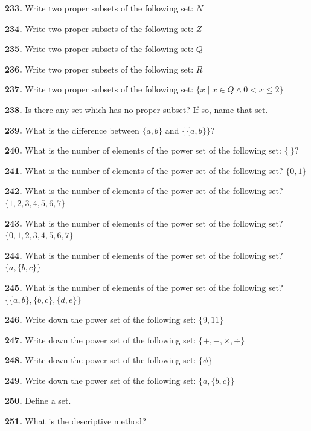 \documentclass[11pt]{article}
\begin{document}
\bigskip
\noindent\textbf{233.} Write two proper subsets of the following set: $N$

\bigskip
\noindent\textbf{234.} Write two proper subsets of the following set: $Z$

\bigskip
\noindent\textbf{235.} Write two proper subsets of the following set: $Q$

\bigskip
\noindent\textbf{236.} Write two proper subsets of the following set: $R$

\bigskip
\noindent\textbf{237.} Write two proper subsets of the following set: $\{x \mid x\in Q \land 0<x\leq2\}$

\bigskip
\noindent\textbf{238.} Is there any set which has no proper subset? If so, name that set.

\bigskip
\noindent\textbf{239.} What is the difference between $\{a,b\}$ and $\{\{a,b\}\}$?

\bigskip
\noindent\textbf{240.} What is the number of elements of the power set of the following set: $\{\ \}$?

\bigskip
\noindent\textbf{241.} What is the number of elements of the power set of the following set? $\{0,1\}$

\bigskip
\noindent\textbf{242.} What is the number of elements of the power set of the following set? $\{1,2,3,4,5,6,7\}$

\bigskip
\noindent\textbf{243.} What is the number of elements of the power set of the following set? $\{0,1,2,3,4,5,6,7\}$

\bigskip
\noindent\textbf{244.} What is the number of elements of the power set of the following set? $\{a,\{b,c\}\}$

\bigskip
\noindent\textbf{245.} What is the number of elements of the power set of the following set? $\{\{a,b\},\{b,c\},\{d,e\}\}$

\bigskip
\noindent\textbf{246.} Write down the power set of the following set: $\{9,11\}$

\bigskip
\noindent\textbf{247.} Write down the power set of the following set: $\{+,-,\times,\div\}$

\bigskip
\noindent\textbf{248.} Write down the power set of the following set: $\{\phi\}$

\bigskip
\noindent\textbf{249.} Write down the power set of the following set: $\{a,\{b,c\}\}$

\bigskip
\noindent\textbf{250.} Define a set.

\bigskip
\noindent\textbf{251.} What is the descriptive method?
\end{document}
